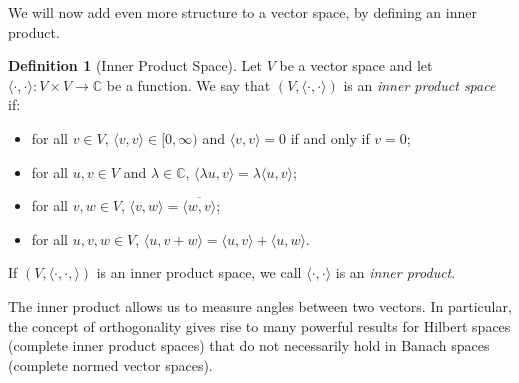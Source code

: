 \documentclass[a4paper, openany]{memoir}
\theoremstyle{definition}
\newtheorem{definition}{Definition}[section]
\theoremstyle{plain}
\begin{document}
    We will now add even more structure to a vector space, by defining an inner product.
    \begin{definition}[Inner Product Space]
        Let $V$ be a vector space and let $\langle \cdot, \cdot \rangle \colon V \times V \to \mathbb{C}$ be a function. We say that $(V, \langle \cdot, \cdot \rangle)$ is an \emph{inner product space} if:
        \begin{itemize}
            \item for all $v \in V$, $\langle v, v \rangle \in [0, \infty)$ and $\langle v, v \rangle = 0$ if and only if $v = 0$;
            \item for all $u, v \in V$ and $\lambda \in \mathbb{C}$, $\langle \lambda u, v \rangle = \lambda \langle u, v \rangle$;
            \item for all $v, w \in V$, $\langle v, w \rangle = \overline{\langle w, v \rangle}$;
            \item for all $u, v, w \in V$, $\langle u, v + w \rangle = \langle u, v \rangle + \langle u, w \rangle$.
        \end{itemize}
        If $(V, \langle \cdot, \cdot, \rangle)$ is an inner product space, we call $\langle \cdot, \cdot \rangle$ is an \emph{inner product}.
    \end{definition}
    \noindent The inner product allows us to measure angles between two vectors. In particular, the concept of orthogonality gives rise to many powerful results for Hilbert spaces (complete inner product spaces) that do not necessarily hold in Banach spaces (complete normed vector spaces).
\end{document}
